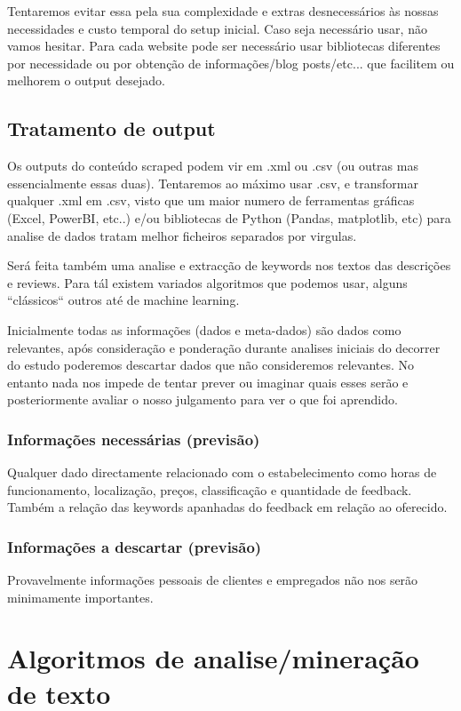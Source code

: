 \documentclass[a4paper,10pt]{article}
\begin{document}
Tentaremos evitar essa pela sua complexidade e extras desnecessários às nossas necessidades e custo temporal do setup inicial.
Caso seja necessário usar, não vamos hesitar.
Para cada website pode ser necessário usar bibliotecas diferentes por necessidade ou por obtenção de informações/blog posts/etc... que facilitem ou melhorem o output desejado.

\subsection{Tratamento de output}

Os outputs do conteúdo scraped podem vir em .xml ou .csv (ou outras mas essencialmente essas duas).
Tentaremos ao máximo usar .csv, e transformar qualquer .xml em .csv, visto que um maior numero de ferramentas gráficas (Excel, PowerBI, etc..) e/ou bibliotecas de Python (Pandas, matplotlib, etc) para analise de dados tratam melhor ficheiros separados por virgulas.

Será feita também uma analise e extracção de keywords nos textos das descrições e reviews.
Para tál existem variados algoritmos que podemos usar, alguns ``clássicos`` outros até de machine learning.

Inicialmente todas as informações (dados e meta-dados) são dados como relevantes, após consideração e ponderação durante analises iniciais do decorrer do estudo poderemos descartar dados que não consideremos relevantes.
No entanto nada nos impede de tentar prever ou imaginar quais esses serão e posteriormente avaliar o nosso julgamento para ver o que foi aprendido.

\subsubsection{Informações necessárias (previsão)}

Qualquer dado directamente relacionado com o estabelecimento como horas de funcionamento, localização, preços, classificação e quantidade de feedback.
Também a relação das keywords apanhadas do feedback em relação ao oferecido.

\subsubsection{Informações a descartar (previsão)}

Provavelmente informações pessoais de clientes e empregados não nos serão minimamente importantes.

\section{Algoritmos de analise/mineração de texto}
\end{document}
